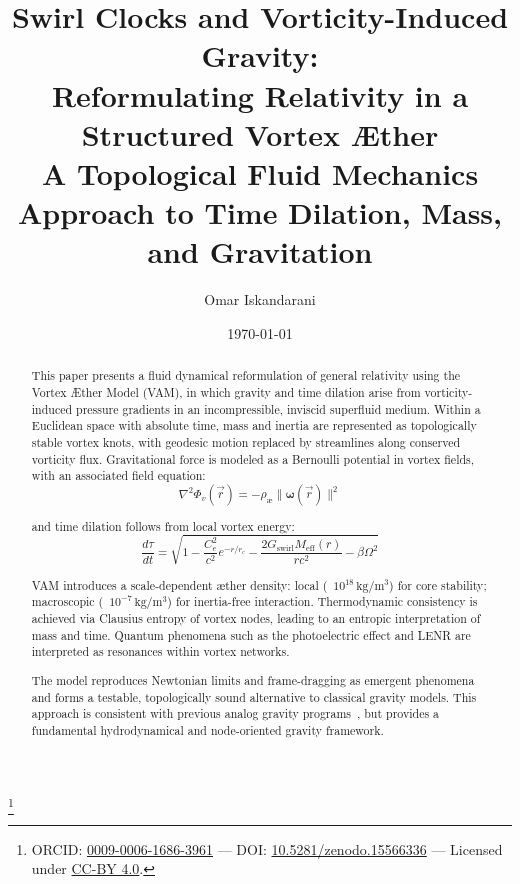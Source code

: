 \documentclass[a4paper, aps,preprint,superscriptaddress, 12pt]{revtex4}
\begin{document}
\author{Omar Iskandarani}
\title{
    Swirl Clocks and Vorticity-Induced Gravity:\\
    Reformulating Relativity in a Structured Vortex Æther\\
    \textnormal{\normalsize A Topological Fluid Mechanics Approach to Time Dilation, Mass, and Gravitation}
}

\date{\today}
\thanks{ORCID: \href{https://orcid.org/0009-0006-1686-3961}{0009-0006-1686-3961} — \footnotesize DOI: \href{https://doi.org/10.5281/zenodo.15566336}{10.5281/zenodo.15566336}  — Licensed under \href{https://creativecommons.org/licenses/by/4.0/}{CC-BY 4.0}.}



\begin{abstract}
    This paper presents a fluid dynamical reformulation of general relativity using the Vortex Æther Model (VAM), in which gravity and time dilation arise from vorticity-induced pressure gradients in an incompressible, inviscid superfluid medium. Within a Euclidean space with absolute time, mass and inertia are represented as topologically stable vortex knots, with geodesic motion replaced by streamlines along conserved vorticity flux. Gravitational force is modeled as a Bernoulli potential in vortex fields, with an associated field equation:
    \begin{equation*}
        \nabla^2 \Phi_v(\vec{r}) = -\rho_\text{\ae} \|\boldsymbol{\omega}(\vec{r})\|^2
    \end{equation*}

    and time dilation follows from local vortex energy:
    \begin{equation*}
        \frac{d\tau}{dt} = \sqrt{1 - \frac{C_e^2}{c^2} e^{-r/r_c} - \frac{2G_\text{swirl} M_\text{eff}(r)}{rc^2} - \beta \Omega^2}
    \end{equation*}

    VAM introduces a scale-dependent æther density: local (~$10^{18}\,\mathrm{kg/m^3}$) for core stability; macroscopic (~$10^{-7}\,\mathrm{kg/m^3}$) for inertia-free interaction. Thermodynamic consistency is achieved via Clausius entropy of vortex nodes, leading to an entropic interpretation of mass and time. Quantum phenomena such as the photoelectric effect and LENR are interpreted as resonances within vortex networks.

    The model reproduces Newtonian limits and frame-dragging as emergent phenomena and forms a testable, topologically sound alternative to classical gravity models. This approach is consistent with previous analog gravity programs~\cite{barcelo2011analogue,volovik2009universe}, but provides a fundamental hydrodynamical and node-oriented gravity framework.
\end{abstract}
\end{document}
